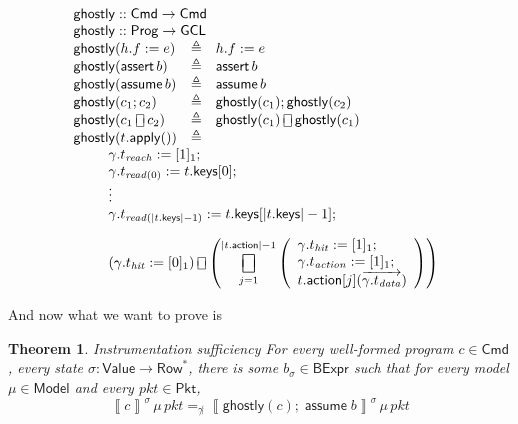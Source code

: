 \documentclass{article}
\newcommand{\pkt}{\mathit{pkt}}
\newcommand{\denote}[1]{\left\llbracket#1\right\rrbracket}
\newcommand{\Value}{\mathsf{Value}}
\newcommand{\BExpr}{\mathsf{BExpr}}
\newcommand{\Cmd}{\mathsf{Cmd}}
\newcommand{\Prog}{\mathsf{Prog}}
\newcommand{\GCL}{\mathsf{GCL}}
\newcommand{\Pkt}{\mathsf{Pkt}}
\newcommand{\Model}{\mathsf{Model}}
\newcommand{\Row}{\mathsf{Row}}
\newcommand{\action}{\mathsf{action}}
\newcommand{\keys}{\mathsf{keys}}
\newcommand{\assert}{\mathop{\mathsf{assert}}}
\newcommand{\assume}{\mathop{\mathsf{assume}}}
\newcommand{\apply}{\mathsf{apply}}
\newcommand{\choiceop}{\rotatebox[origin=c]{90}{$\sqsubset\!\!\!\sqsupset$}}
\newcommand{\choice}{\mathbin{\choiceop}}
\DeclareMathOperator*{\bigchoice}{\scalerel*{\choiceop}{\sum}}
\newcommand{\ghostly}{\mathsf{ghostly}}
\newtheorem{theorem}{Theorem}
\begin{document}
\[
\begin{array}{l>{\triangleq}cl}
  \multicolumn{3}{l}{\ghostly :: \Cmd \to \Cmd} \\
  \multicolumn{3}{l}{\ghostly :: \Prog \to \GCL} \\
  \ghostly(h.f := e)
  && h.f := e \\
  \ghostly(\assert b)
  && \assert b\\
  \ghostly(\assume b)
  && \assume b \\
  \ghostly(c_1;c_2)
  && \ghostly(c_1);\ghostly(c_2) \\
  \ghostly(c_1\choice c_2)
  && \ghostly(c_1) \choice \ghostly(c_1)\\
  \ghostly(t.\apply())
  &&\\
  \multicolumn{3}{c}{
    \begin{array}[t]{>{\displaystyle\qquad}l}
       \gamma.t_{\mathit{reach}} := [1]_1; \\
       \gamma.t_{\mathit{read}(0)} := t.\keys[0]; \\
       \vdots \\
       \gamma.t_{\mathit{read}(|t.\keys|-1)} := t.\keys[|t.\keys|-1]; \\[1em]
       \left(\gamma.t_{\mathit{hit}} := [0]_1 \right)
       \choice \left(\bigchoice_{j = 1}^{|t.\action|-1}{
         \left(\begin{array}{l}
           \gamma.t_{\mathit{hit}} := [1]_1 ;\\
           \gamma.t_{\mathit{action}} := [1]_1;\\
           t.\action[j](\overrightarrow{\gamma.t_{\mathit{data}}})
         \end{array}\right)
       }\right)
     \end{array}}
\end{array}
\]

And now what we want to prove is

\begin{theorem}{Instrumentation sufficiency}
  For every well-formed program $c \in \Cmd$, every state $\sigma : \Value \to
  \Row^*$, there is some $b_\sigma \in \BExpr$ such that for every model $\mu
  \in \Model$ and every $\pkt \in \Pkt$,
  \[\denote{c}^\sigma\,\mu\,\pkt =_{\not\gamma} \denote{\ghostly(c);\assume b}^\sigma\,\mu\,\pkt\]
\end{theorem}
\end{document}
